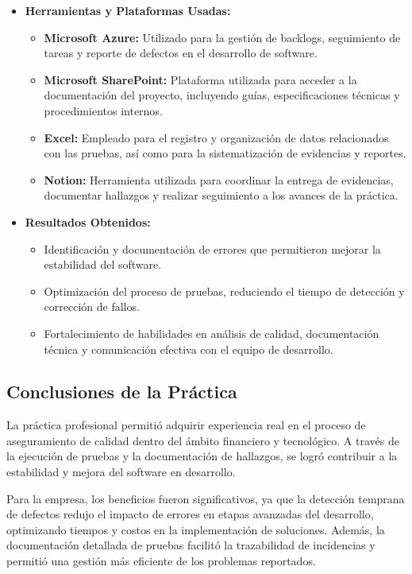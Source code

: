 \documentclass[12pt,a4paper]{report}
\begin{document}
\begin{itemize}
    \item \textbf{Herramientas y Plataformas Usadas:}
    \begin{itemize}
        \item \textbf{Microsoft Azure:} Utilizado para la gestión de backlogs, seguimiento de tareas y reporte de defectos en el desarrollo de software.
        \item \textbf{Microsoft SharePoint:} Plataforma utilizada para acceder a la documentación del proyecto, incluyendo guías, especificaciones técnicas y procedimientos internos.
        \item \textbf{Excel:} Empleado para el registro y organización de datos relacionados con las pruebas, así como para la sistematización de evidencias y reportes.
        \item \textbf{Notion:} Herramienta utilizada para coordinar la entrega de evidencias, documentar hallazgos y realizar seguimiento a los avances de la práctica.
    \end{itemize}

    \item \textbf{Resultados Obtenidos:}
    \begin{itemize}
        \item Identificación y documentación de errores que permitieron mejorar la estabilidad del software.
        \item Optimización del proceso de pruebas, reduciendo el tiempo de detección y corrección de fallos.
        \item Fortalecimiento de habilidades en análisis de calidad, documentación técnica y comunicación efectiva con el equipo de desarrollo.
    \end{itemize}
\end{itemize}

\subsection{Conclusiones de la Práctica}

La práctica profesional permitió adquirir experiencia real en el proceso de aseguramiento de calidad dentro del ámbito financiero y tecnológico. A través de la ejecución de pruebas y la documentación de hallazgos, se logró contribuir a la estabilidad y mejora del software en desarrollo.

Para la empresa, los beneficios fueron significativos, ya que la detección temprana de defectos redujo el impacto de errores en etapas avanzadas del desarrollo, optimizando tiempos y costos en la implementación de soluciones. Además, la documentación detallada de pruebas facilitó la trazabilidad de incidencias y permitió una gestión más eficiente de los problemas reportados.
\end{document}
